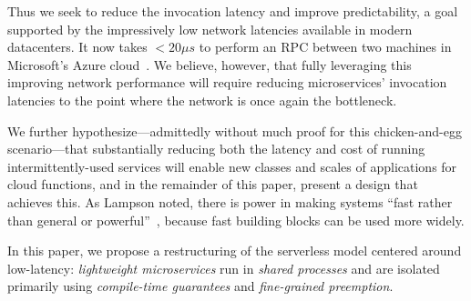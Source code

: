 Thus we seek to reduce the invocation latency and improve predictability, a
goal supported by the impressively low network latencies available in
modern datacenters. It
now takes $<20\mu{}s$ to perform an RPC between two machines in Microsoft's Azure
cloud~\cite{www-firestone-azure-latency}.  We believe, however, that fully leveraging
this improving network performance will require reducing microservices' invocation
latencies to the point where the network is once again the bottleneck.

We further hypothesize---admittedly without much proof for this chicken-and-egg
scenario---that substantially reducing both the latency and cost of running
intermittently-used services will enable new classes and scales of applications
for cloud functions, and in the remainder of this paper, present a design that
achieves this.  As Lampson noted, there is power in making systems 
``fast rather than general or powerful''~\cite{Lampson1983}, because fast
building blocks can be used more widely.

In this paper, we propose a restructuring of the serverless model centered around
low-latency: \textit{lightweight microservices} run in \textit{shared processes}
and are isolated primarily using \textit{compile-time guarantees} and
\textit{fine-grained preemption}.



